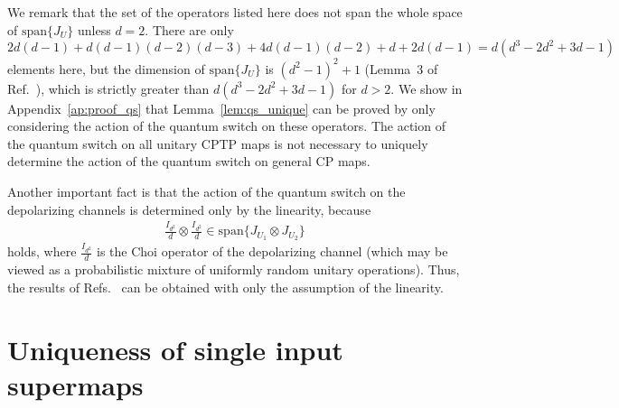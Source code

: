 \documentclass[a4paper,twocolumn,accepted=2022-10-23]{quantumarticle}
\theoremstyle{definition}
\begin{document}
We remark that the set of the operators listed here does not span the whole space of $\mathrm{span} \{ J_U \}$ unless $d=2$.
There are only $2d(d-1) + d(d-1)(d-2)(d-3) + 4d(d-1)(d-2) + d + 2d(d-1) = d (d^3 -2 d^2  + 3 d  -1)$ elements here,
but the dimension of $\mathrm{span} \{ J_U \}$ is $(d^2-1)^2 + 1$ (Lemma~3 of Ref.~\cite{sn}), which is strictly greater than $d (d^3 -2 d^2  + 3 d  -1)$ for $d > 2$.
We show in Appendix~\ref{ap:proof_qs} that Lemma~\ref{lem:qs_unique} can be proved by only considering the action of the quantum switch on these operators.
The action of the quantum switch on all unitary CPTP maps is not necessary to uniquely determine the action of the quantum switch on general CP maps.


Another important fact is that the action of the quantum switch on the depolarizing channels is determined only by the linearity,
because
\begin{align}
\frac{I_{d^2}}{d} \otimes \frac{I_{d^2}}{d} \in \mathrm{span} \{ J_{U_1} \otimes J_{U_2} \}
\end{align}
holds, where $\frac{I_{d^2}}{d}$ is the Choi operator of the depolarizing channel (which may be viewed as a probabilistic mixture of uniformly random unitary operations).
Thus, the results of Refs.~\cite{qs_comm1,qs_comm2,qs_comm3} can be obtained with only the assumption of the linearity.


\section{Uniqueness of single input supermaps}\label{sec:single}
\end{document}
